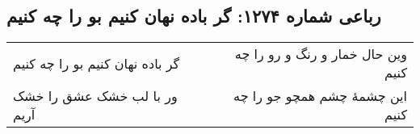 \begin{center}
\section*{رباعی شماره ۱۲۷۴: گر باده نهان کنیم بو را چه کنیم}
\label{sec:1274}
\begin{longtable}{l p{0.5cm} r}
گر باده نهان کنیم بو را چه کنیم
&&
وین حال خمار و رنگ و رو را چه کنیم
\\
ور با لب خشک عشق را خشک آریم
&&
این چشمهٔ چشم همچو جو را چه کنیم
\\
\end{longtable}
\end{center}
